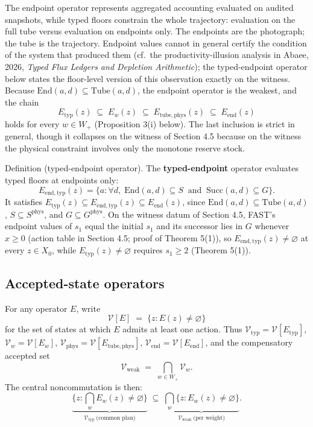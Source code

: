 \documentclass[review,11pt]{elsarticle}
\begin{document}
The endpoint operator represents aggregated accounting evaluated on audited snapshots, while typed floors constrain the whole trajectory: evaluation on the full tube versus evaluation on endpoints only. The endpoints are the photograph; the tube is the trajectory. Endpoint values cannot in general certify the condition of the system that produced them (cf.\ the productivity-illusion analysis in Abaee, 2026, \emph{Typed Flux Ledgers and Depletion Arithmetic}); the typed-endpoint operator below states the floor-level version of this observation exactly on the witness. Because \(\mathrm{End}(a,d) \subseteq \mathrm{Tube}(a,d)\), the
endpoint operator is the weakest, and the chain
\[E_{\mathrm{typ}}(z) \;\subseteq\; E_w(z) \;\subseteq\; E_{\mathrm{tube,phys}}(z) \;\subseteq\; E_{\mathrm{end}}(z)\]
holds for every \(w \in W_+\) (Proposition 3(i) below). The last
inclusion is strict in general, though it collapses on the witness of
Section 4.5 because on the witness the physical constraint involves only the monotone reserve stock.

Definition (typed-endpoint operator). The \textbf{typed-endpoint} operator evaluates typed floors at endpoints only:
\[E_{\mathrm{end,typ}}(z) = \{ a : \forall d,\; \mathrm{End}(a,d) \subseteq S \ \text{ and } \ \mathrm{Succ}(a,d) \subseteq G \}.\]
It satisfies \(E_{\mathrm{typ}}(z) \subseteq E_{\mathrm{end,typ}}(z) \subseteq E_{\mathrm{end}}(z)\), since \(\mathrm{End}(a,d) \subseteq \mathrm{Tube}(a,d)\), \(S \subseteq S^{\mathrm{phys}}\), and \(G \subseteq G^{\mathrm{phys}}\). On the witness datum of Section 4.5, FAST's endpoint values of \(s_1\) equal the initial \(s_1\) and its successor lies in \(G\) whenever \(x \ge 0\) (action table in Section 4.5; proof of Theorem 5(1)), so \(E_{\mathrm{end,typ}}(z) \neq \varnothing\) at every \(z \in X_0\), while \(E_{\mathrm{typ}}(z) \neq \varnothing\) requires \(s_1 \ge 2\) (Theorem 5(1)).

\subsection{Accepted-state
operators}\label{accepted-state-operators}

For any operator \(E\), write
\[\mathcal{V}[E] \;=\; \{ z : E(z) \neq \varnothing \}\] for the set of
states at which \(E\) admits at least one action. Thus
\(\mathcal{V}_{\mathrm{typ}} = \mathcal{V}[E_{\mathrm{typ}}]\),
\(\mathcal{V}_w = \mathcal{V}[E_w]\),
\(\mathcal{V}_{\mathrm{phys}} = \mathcal{V}[E_{\mathrm{tube,phys}}]\),
\(\mathcal{V}_{\mathrm{end}} = \mathcal{V}[E_{\mathrm{end}}]\), and the
compensatory accepted set
\[\mathcal{V}_{\mathrm{weak}} \;=\; \bigcap_{w \in W_+} \mathcal{V}_w .\]
The central noncommutation is then:
\[\underbrace{\{ z : \textstyle\bigcap_w E_w(z) \neq \varnothing \}}_{\mathcal{V}_{\mathrm{typ}} \ \text{(common plan)}} \;\subseteq\; \underbrace{\bigcap_w \{ z : E_w(z) \neq \varnothing \}}_{\mathcal{V}_{\mathrm{weak}} \ \text{(per weight)}}.\]
\end{document}
